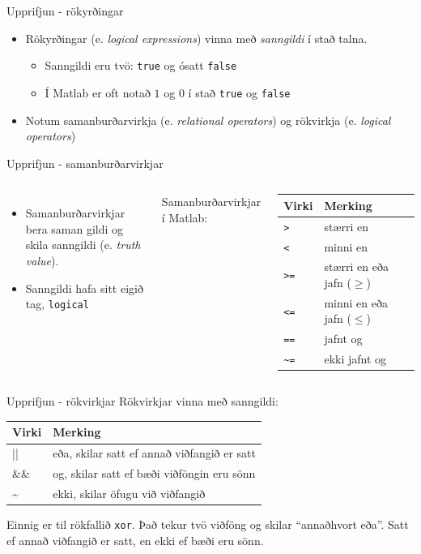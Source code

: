 \documentclass{beamer}
\begin{document}
\begin{frame}{Upprifjun - rökyrðingar}
\begin{itemize}
 \item Rökyrðingar (e. \emph{logical expressions}) vinna með \emph{sanngildi} í stað talna.
 \begin{itemize}
  \item Sanngildi eru tvö: \texttt{true} og ósatt \texttt{false}
  \item Í Matlab er oft notað $1$ og $0$ í stað \texttt{true} og \texttt{false}
 \end{itemize}
 \item Notum samanburðarvirkja (e. \emph{relational operators}) og rökvirkja (e. \emph{logical operators})
\end{itemize}
\end{frame}

\begin{frame}{Upprifjun - samanburðarvirkjar}
\begin{columns}
\begin{itemize}
 \item Samanburðarvirkjar bera saman gildi og skila sanngildi (e. \emph{truth value}).
 \item Sanngildi hafa sitt eigið tag, \texttt{logical}
\end{itemize}

\vspace{0.5cm}
Samanburðarvirkjar í Matlab: 

\vspace{0.2cm}
\begin{tabular}{ll}
\toprule
Virki&Merking\\
\midrule
\texttt{>}&stærri en\\
\texttt{<}&minni en\\
\texttt{>=}&stærri en eða jafn ($\geq$)\\
\texttt{<=}&minni en eða jafn ($\leq$)\\
\texttt{==}&jafnt og\\
\texttt{\~}\texttt{=}&ekki jafnt og\\
\bottomrule
\end{tabular}
\end{columns}
\end{frame}

\begin{frame}{Upprifjun - rökvirkjar}
Rökvirkjar vinna með sanngildi:
\begin{center}
\begin{tabular}{ll}
\toprule
Virki&Merking\\
\midrule
||& eða, skilar satt ef annað viðfangið er satt\\
\&\& & og, skilar satt ef bæði viðföngin eru sönn\\
\~{} &ekki, skilar öfugu við viðfangið\\
\bottomrule
\end{tabular}
\end{center}
Einnig er til rökfallið \texttt{xor}. Það tekur tvö viðföng og skilar ``annaðhvort eða''. Satt ef annað viðfangið er satt, en ekki ef bæði eru sönn.
\end{frame}
\end{document}
